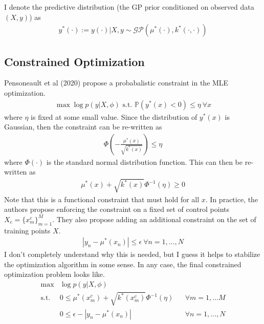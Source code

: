 \documentclass[12pt]{article}
\newcommand*{\abs}[1]{\left\lvert#1\right\rvert}
\newcommand{\Prob}{\mathbb{P}}
\begin{document}
I denote the predictive distribution (the GP prior conditioned on observed data $(X, y)$) as 
\begin{align*}
y^*(\cdot) := y(\cdot)|X, y \sim \mathcal{GP}(\mu^*(\cdot), k^*(\cdot, \cdot)) 
\end{align*}

\subsection{Constrained Optimization}
Pensoneault et al (2020) propose a probabalistic constraint in the MLE optimization. 
\begin{align*}
\max \log p(y|X, \phi) \text{ s.t. } \Prob(y^*(x) < 0) \leq \eta \ \forall x
\end{align*}
where $\eta$ is fixed at some small value. Since the distribution of $y^*(x)$ is Gaussian, then the constraint can be re-written as 
\begin{align*}
\Phi\left(-\frac{\mu^*(x)}{\sqrt{k^*(x)}} \right) \leq \eta
\end{align*}
where $\Phi(\cdot)$ is the standard normal distribution function. This can then be re-written as 
\begin{align*}
\mu^*(x) + \sqrt{k^*(x)} \Phi^{-1}(\eta) \geq 0
\end{align*}
Note that this is a functional constraint that must hold for all $x$. In practice, the authors propose enforcing the constraint on a fixed set of 
control points $X_c = \{x^c_m\}_{m = 1}^{M}$. They also propose adding an additional constraint on the set of training points $X$. 
\begin{align*}
\abs{y_n - \mu^*(x_n)} \leq \epsilon \ \forall n = 1, \dots, N
\end{align*}
I don't completely understand why this is needed, but I guess it helps to stabilize the optimization algorithm in some sense. In any case, the final 
constrained optimization problem looks like. 
\begin{align*}
\max &\log p(y|X, \phi) \\
\text{s.t. } &0 \leq \mu^*(x^c_m) + \sqrt{k^*(x^c_m)} \Phi^{-1}(\eta) &&\forall m = 1, \dots M \\
&0 \leq \epsilon - \abs{y_n - \mu^*(x_n)} &&\forall n = 1, \dots, N
\end{align*}
\end{document}
